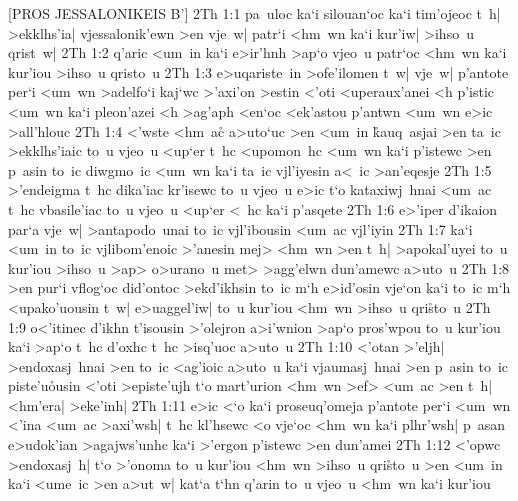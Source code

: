 [PROS JESSALONIKEIS B']
\vs 2Th 1:1
pa~uloc
ka`i
silouan`oc
ka`i
tim'ojeoc
t~h|
>ekklhs'ia|
vjessalonik'ewn
>en
vje~w|
patr`i
<hm~wn
ka`i
kur'iw|
>ihso~u
qrist~w|\bibvsend
\vs 2Th 1:2
q'aric
<um~in
ka`i
e>ir'hnh
>ap`o
vjeo~u
patr`oc
<hm~wn
ka`i
kur'iou
>ihso~u
qristo~u\bibvsend
\vs 2Th 1:3
e>uqariste~in
>ofe'ilomen
t~w|
vje~w|
p'antote
per`i
<um~wn
>adelfo`i
kaj`wc
>'axi'on
>estin
<'oti
<uperaux'anei
<h
p'istic
<um~wn
ka`i
pleon'azei
<h
>ag'aph
<en`oc
<ek'astou
p'antwn
<um~wn
e>ic
>all'hlouc\bibvsend
\vs 2Th 1:4
<'wste
<hm~ac\r{}
a>uto`uc
>en
<um~in
\r{k}auq~asjai
>en
ta~ic
>ekklhs'iaic
to~u
vjeo~u
<up`er
t~hc
<upomon~hc
<um~wn
ka`i
p'istewc
>en
p~asin
to~ic
diwgmo~ic
<um~wn
ka`i
ta~ic
vjl'iyesin
a<~ic
>an'eqesje\bibvsend
\vs 2Th 1:5
>'endeigma
t~hc
dika'iac
kr'isewc
to~u
vjeo~u
e>ic
t`o
kataxiwj~hnai
<um~ac
t~hc
vbasile'iac
to~u
vjeo~u
<up`er
<~hc
ka`i
p'asqete\bibvsend
\vs 2Th 1:6
e>'iper
d'ikaion
par`a
vje~w|
>antapodo~unai
to~ic
vjl'ibousin
<um~ac
vjl'iyin\bibvsend
\vs 2Th 1:7
ka`i
<um~in
to~ic
vjlibom'enoic
>'anesin
mej>
<hm~wn
>en
t~h|
>apokal'uyei
to~u
kur'iou
>ihso~u
>ap>
o>urano~u
met>
>agg'elwn
dun'amewc
a>uto~u\bibvsend
\vs 2Th 1:8
>en
pur`i
vflog`oc
did'ontoc
>ekd'ikhsin
to~ic
m`h
e>id'osin
vje`on
ka`i
to~ic
m`h
<upako'uousin
t~w|
e>uaggel'iw|
to~u
kur'iou
<hm~wn
>ihso~u
qri\r{s}to~u\bibvsend
{}
\vs 2Th 1:9
o<'itinec
d'ikhn
t'isousin
>'olejron
a>i'wnion
>ap`o
pros'wpou
to~u
kur'iou
ka`i
>ap`o
t~hc
d'oxhc
t~hc
>isq'uoc
a>uto~u\bibvsend
\vs 2Th 1:10
<'otan
>'eljh|
>endoxasj~hnai
>en
to~ic
<ag'ioic
a>uto~u
ka`i
vjaumasj~hnai
>en
p~asin
to~ic
piste'u\r{o}usin
<'oti
>episte'ujh
t`o
mart'urion
<hm~wn
>ef>
<um~ac
>en
t~h|
<hm'era|
>eke'inh|\bibvsend
\vs 2Th 1:11
e>ic
<`o
ka`i
proseuq'omeja
p'antote
per`i
<um~wn
<'ina
<um~ac
>axi'wsh|
t~hc
kl'hsewc
<o
vje`oc
<hm~wn
ka`i
plhr'wsh|
p~asan
e>udok'ian
>agajws'unhc
ka`i
>'ergon
p'istewc
>en
dun'amei\bibvsend
\vs 2Th 1:12
<'opwc
>endoxasj~h|
t`o
>'onoma
to~u
kur'iou
<hm~wn
>ihso~u
qri\r{s}to~u
>en
<um~in
ka`i
<ume~ic
>en
a>ut~w|
kat`a
t`hn
q'arin
to~u
vjeo~u
<hm~wn
ka`i
kur'iou
